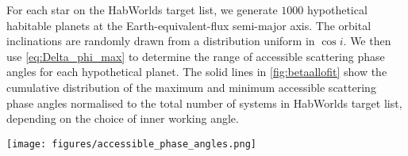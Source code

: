 \documentclass[
    usenatbib,
]{mnras}
\newcommand{\todo}[1]{\textcolor{red}{[#1]}}
\newcommand{\IWA}{\ensuremath{\mathrm{IWA}}}
\newcommand{\hwo}{HabWorlds}
\begin{document}
For each star on the \hwo{} target list, we generate $1000$  hypothetical habitable planets at the Earth-equivalent-flux semi-major axis. 
%
The orbital inclinations are randomly drawn from a distribution uniform in $\cos i$. 
%
We then use \cref{eq:Delta_phi_max} to determine the range of accessible scattering phase angles for each hypothetical planet.
%
The solid lines in \cref{fig:betaallofit} show the cumulative distribution of the maximum and minimum accessible scattering phase angles normalised to the total number of systems in \hwo{} target list, depending on the choice of inner working angle.  


\begin{figure*}[t]
    \centering
    \texttt{[image: figures/accessible\_phase\_angles.png]}  
    \caption{
        \todo{shouldn't lambda/D for 600nm give 21, 41, 62, 83 mas?} 
        Cumulative distributions of the most extreme scattering phase angle accessible for different \IWA where the solid lines are for randomly inclined circular orbits and the dashed lines are for randomly orientated elliptical orbits.
        The top x axis indicates the minimum scattering phase angle and the bottom x axis indicates the maximum.
        These are symmetric about quadrature (90 degrees) \todo{is this true for elliptical orbits?}.
        The y axis indicates the number of systems divided by the number of Monte Carlo samples and is thus normalised to the number of systems in the target list.
        The secondary y axis indicates the number of systems assuming only 24 percent of them contain an Earth-like exoplanet in the habitable zone.
    }
    \label{fig:betaallofit}
\end{figure*}
\end{document}

